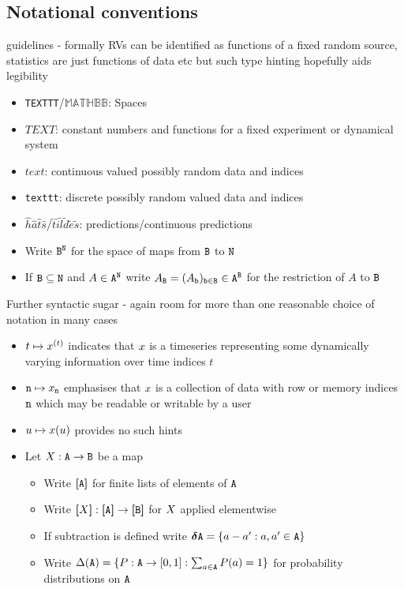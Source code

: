 \documentclass{article}
\begin{document}
\subsection{Notational conventions}
guidelines - formally RVs can be identified as functions of a fixed random source, statistics are just functions of data etc but such type hinting hopefully aids legibility
\begin{itemize}
  \item
    \texttt{TEXTTT}/$\mathbb{MATHBB}$: Spaces
  \item
    $TEXT$: constant numbers and functions for a fixed experiment or dynamical system
  \item
    $text$: continuous valued possibly random data and indices
  \item
    \texttt{texttt}: discrete possibly random valued data and indices
  \item
    $\hat h\hat a\hat t\hat s/\tilde t\tilde i\tilde l\tilde d\tilde e\tilde s$: predictions/continuous predictions
  \item
    Write ${\texttt{B}}^{\texttt N}$ for the space of maps from ${\texttt{B}}$ to ${\texttt N}$
  \item
    If ${\texttt{B}}\subseteq{\texttt N}$ and  $A\in\TYPE[A]^\ROWS$ write $\REST[A]=(\IND[A][b])_{\texttt b\in\BATCH}\in\TYPE[A]^\BATCH$ for the restriction of $A$ to ${\texttt{B}}$
\end{itemize}
Further syntactic sugar - again room for more than one reasonable choice of notation in many cases
\begin{itemize}
  \item
    $t\mapsto\TS$ indicates that $\Feat$ is a timeseries representing some dynamically varying information over time indices $t$
  \item
    $\ind\mapsto\IND$ emphasises that $\Feat$ is a collection of data with row or memory indices $\ind$ which may be readable or writable by a user
  \item
    $\Usr\mapsto\Feat(\Usr)$ provides no such hints
  \item
    Let $\FEAT:\A\rightarrow\B$ be a map
    \begin{itemize}
      \item Write $\LS$ for finite lists of elements of $\A$
      \item Write $\LS[\FEAT]:\LS\rightarrow\LS[\B]$ for $\FEAT$ applied elementwise
      \item If subtraction is defined write $\DIFF\A=\{a-a':a,a'\in\A\}$
      \item Write $\Probs(\A)=\{\PMF:\A\rightarrow[0,1]:\sum_{a\in \A}\PMF(a)=1\}$ for probability distributions on $\A$
    \end{itemize}
\end{itemize}
\end{document}
